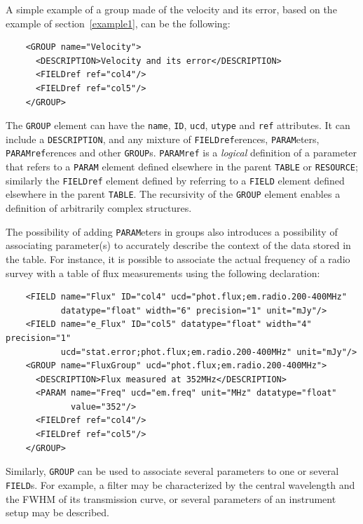 \documentclass[11pt,a4paper]{ivoa}
\def\Aref#1{section~\ref{#1}}
\let\fg=\color
\def\attr#1{{\tt{\fg{DarkRed}#1}}}
\def\elem#1{{\tt{\fg{DarkRed}#1}}}
\begin{document}
A simple example of a group made of the velocity and its error,
based on the example of \Aref{example1},
can be the following:

\begingroup
\begin{verbatim}
    <GROUP name="Velocity">
      <DESCRIPTION>Velocity and its error</DESCRIPTION>
      <FIELDref ref="col4"/>
      <FIELDref ref="col5"/>
    </GROUP>
\end{verbatim}
\endgroup


The \elem{GROUP} element can have the \attr{name}, \attr{ID}, \attr{ucd},
\attr{utype} and \attr{ref} attributes.
It can include a \elem{DESCRIPTION}, and any mixture of %
\elem{FIELDref}erences,
\elem{PARAM}eters, \elem{PARAMref}erences
and other \elem{GROUP}s. \elem{PARAMref} is a {\em logical} definition
of a parameter that refers to a \elem{PARAM}
element defined elsewhere in the parent \elem{TABLE} or \elem{RESOURCE};
similarly the \elem{FIELDref} element defined by referring
to a \elem{FIELD} element defined elsewhere in the parent \elem{TABLE}.
The recursivity of the \elem{GROUP} element enables a definition of
arbitrarily complex structures.

The possibility of adding \elem{PARAM}eters in groups also introduces
a possibility of associating parameter(s) to  accurately  describe
the context of the data stored in the table.
For instance,
it is possible to associate the actual frequency of a radio survey with
a table of flux measurements using
the following declaration:

\begin{verbatim}
    <FIELD name="Flux" ID="col4" ucd="phot.flux;em.radio.200-400MHz"
           datatype="float" width="6" precision="1" unit="mJy"/>
    <FIELD name="e_Flux" ID="col5" datatype="float" width="4" precision="1"
           ucd="stat.error;phot.flux;em.radio.200-400MHz" unit="mJy"/>
    <GROUP name="FluxGroup" ucd="phot.flux;em.radio.200-400MHz">
      <DESCRIPTION>Flux measured at 352MHz</DESCRIPTION>
      <PARAM name="Freq" ucd="em.freq" unit="MHz" datatype="float"
             value="352"/>
      <FIELDref ref="col4"/>
      <FIELDref ref="col5"/>
    </GROUP>
\end{verbatim}

\par
Similarly, \elem{GROUP} can be used to associate several parameters
to one or several \elem{FIELD}s. For example, a filter may be
characterized by the central wavelength and the FWHM of its transmission
curve, or several parameters of an instrument setup may be described.
\end{document}
